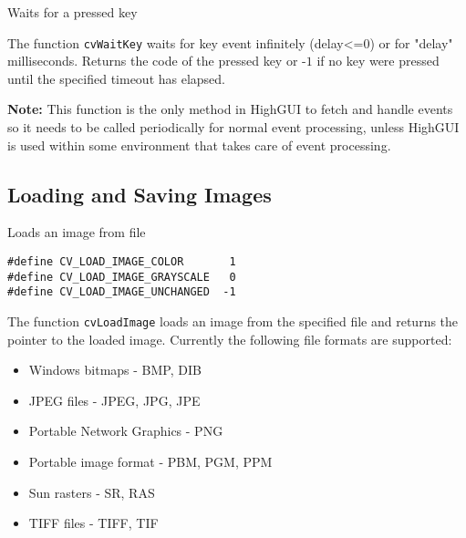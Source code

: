 
Waits for a pressed key


\begin{description}
\end{description}

The function \texttt{cvWaitKey} waits for key event infinitely (delay<=0) or for "delay" milliseconds. Returns the code of the pressed key or -$1$ if no key were pressed until the specified timeout has elapsed.

\textbf{Note:} This function is the only method in HighGUI to fetch and handle events so it needs to be called periodically for normal event processing, unless HighGUI is used within some environment that takes care of event processing.

\subsection{Loading and Saving Images}


Loads an image from file


\begin{lstlisting}
#define CV_LOAD_IMAGE_COLOR       1
#define CV_LOAD_IMAGE_GRAYSCALE   0
#define CV_LOAD_IMAGE_UNCHANGED  -1
\end{lstlisting}

\begin{description}
\end{description}

The function \texttt{cvLoadImage} loads an image from the specified file and returns the pointer to the loaded image. Currently the following file formats are supported:
\begin{itemize}
\item Windows bitmaps - BMP, DIB
\item JPEG files - JPEG, JPG, JPE
\item Portable Network Graphics - PNG
\item Portable image format - PBM, PGM, PPM
\item Sun rasters - SR, RAS
\item TIFF files - TIFF, TIF
\end{itemize}

